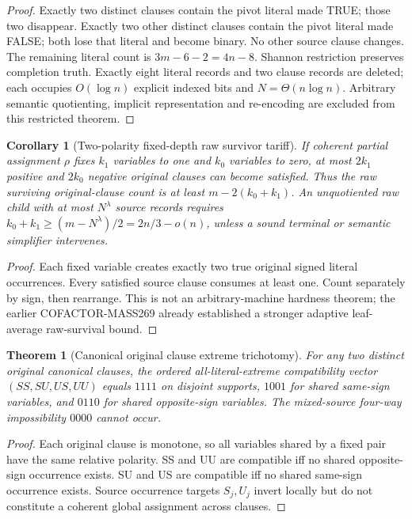 \documentclass[10pt]{article}
\newtheorem{theorem}{Theorem}
\newtheorem{corollary}{Corollary}
\begin{document}
\begin{proof}
Exactly two distinct clauses contain the pivot literal made TRUE; those two disappear. Exactly two other distinct clauses contain the pivot literal made FALSE; both lose that literal and become binary. No other source clause changes. The remaining literal count is $3m-6-2=4n-8$. Shannon restriction preserves completion truth. Exactly eight literal records and two clause records are deleted; each occupies $O(\log n)$ explicit indexed bits and $N=\Theta(n\log n)$. Arbitrary semantic quotienting, implicit representation and re-encoding are excluded from this restricted theorem.
\end{proof}
\begin{corollary}[Two-polarity fixed-depth raw survivor tariff]
If coherent partial assignment $\rho$ fixes $k_1$ variables to one and $k_0$ variables to zero, at most $2k_1$ positive and $2k_0$ negative original clauses can become satisfied. Thus the raw surviving original-clause count is at least $m-2(k_0+k_1)$. An unquotiented raw child with at most $N^\lambda$ source records requires $k_0+k_1\ge(m-N^\lambda)/2=2n/3-o(n)$, unless a sound terminal or semantic simplifier intervenes.
\end{corollary}
\begin{proof}Each fixed variable creates exactly two true original signed literal occurrences. Every satisfied source clause consumes at least one. Count separately by sign, then rearrange. This is not an arbitrary-machine hardness theorem; the earlier COFACTOR-MASS269 already established a stronger adaptive leaf-average raw-survival bound.\end{proof}
\begin{theorem}[Canonical original clause extreme trichotomy]
For any two distinct original canonical clauses, the ordered all-literal-extreme compatibility vector $(SS,SU,US,UU)$ equals $1111$ on disjoint supports, $1001$ for shared same-sign variables, and $0110$ for shared opposite-sign variables. The mixed-source four-way impossibility $0000$ cannot occur.
\end{theorem}
\begin{proof}Each original clause is monotone, so all variables shared by a fixed pair have the same relative polarity. SS and UU are compatible iff no shared opposite-sign occurrence exists. SU and US are compatible iff no shared same-sign occurrence exists. Source occurrence targets $S_j,U_j$ invert locally but do not constitute a coherent global assignment across clauses.\end{proof}
\end{document}
